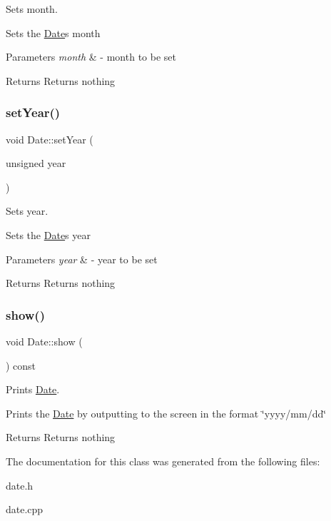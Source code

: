 Sets month. 

Sets the \hyperlink{class_date}{Date}\textquotesingle{}s month


\begin{DoxyParams}{Parameters}
{\em month} & -\/ month to be set \\
\hline
\end{DoxyParams}
\begin{DoxyReturn}{Returns}
Returns nothing 
\end{DoxyReturn}
\mbox{\label{class_date_a262bd42a1ed4378fa115dab321096736}} 
\subsubsection{\texorpdfstring{set\+Year()}{setYear()}}
{\footnotesize\ttfamily void Date\+::set\+Year (\begin{DoxyParamCaption}\item[{unsigned}]{year }\end{DoxyParamCaption})}



Sets year. 

Sets the \hyperlink{class_date}{Date}\textquotesingle{}s year


\begin{DoxyParams}{Parameters}
{\em year} & -\/ year to be set \\
\hline
\end{DoxyParams}
\begin{DoxyReturn}{Returns}
Returns nothing 
\end{DoxyReturn}
\mbox{\label{class_date_a37f8fc7ca1692df7a8b265099c061721}} 
\subsubsection{\texorpdfstring{show()}{show()}}
{\footnotesize\ttfamily void Date\+::show (\begin{DoxyParamCaption}{ }\end{DoxyParamCaption}) const}



Prints \hyperlink{class_date}{Date}. 

Prints the \hyperlink{class_date}{Date} by outputting to the screen in the format \char`\"{}yyyy/mm/dd\char`\"{}

\begin{DoxyReturn}{Returns}
Returns nothing 
\end{DoxyReturn}


The documentation for this class was generated from the following files\+:\begin{DoxyCompactItemize}
\item 
date.\+h\item 
date.\+cpp\end{DoxyCompactItemize}
